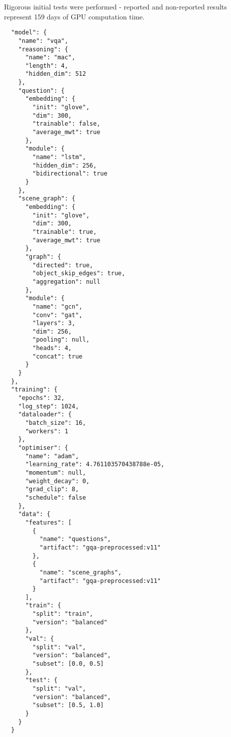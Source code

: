 Rigorous initial tests were performed - reported and non-reported results represent 159 days of GPU computation time.

\begin{verbatim}
  "model": {
    "name": "vqa",
    "reasoning": {
      "name": "mac",
      "length": 4,
      "hidden_dim": 512
    },
    "question": {
      "embedding": {
        "init": "glove",
        "dim": 300,
        "trainable": false,
        "average_mwt": true
      },
      "module": {
        "name": "lstm",
        "hidden_dim": 256,
        "bidirectional": true
      }
    },
    "scene_graph": {
      "embedding": {
        "init": "glove",
        "dim": 300,
        "trainable": true,
        "average_mwt": true
      },
      "graph": {
        "directed": true,
        "object_skip_edges": true,
        "aggregation": null
      },
      "module": {
        "name": "gcn",
        "conv": "gat",
        "layers": 3,
        "dim": 256,
        "pooling": null,
        "heads": 4,
        "concat": true
      }
    }
  },
  "training": {
    "epochs": 32,
    "log_step": 1024,
    "dataloader": {
      "batch_size": 16,
      "workers": 1
    },
    "optimiser": {
      "name": "adam",
      "learning_rate": 4.761103570438788e-05,
      "momentum": null,
      "weight_decay": 0,
      "grad_clip": 8,
      "schedule": false
    },
    "data": {
      "features": [
        {
          "name": "questions",
          "artifact": "gqa-preprocessed:v11"
        },
        {
          "name": "scene_graphs",
          "artifact": "gqa-preprocessed:v11"
        }
      ],
      "train": {
        "split": "train",
        "version": "balanced"
      },
      "val": {
        "split": "val",
        "version": "balanced",
        "subset": [0.0, 0.5]
      },
      "test": {
        "split": "val",
        "version": "balanced",
        "subset": [0.5, 1.0]
      }
    }
  }
\end{verbatim}